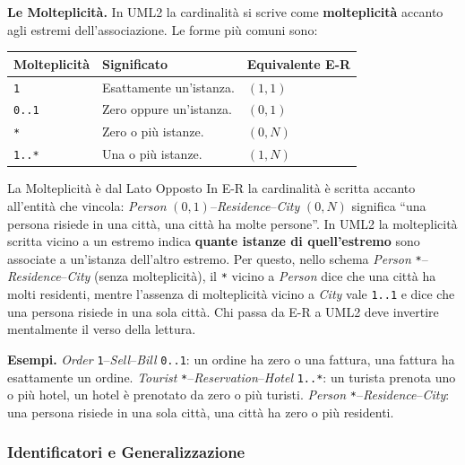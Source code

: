 \documentclass[12pt]{extarticle}
\begin{document}
\medskip
\noindent \textbf{Le Molteplicità.} In UML2 la cardinalità si scrive come \textbf{molteplicità} accanto agli estremi dell'associazione. Le forme più comuni sono:

\begin{center}
\small
\begin{tabular}{@{}L{2.4cm}L{6.4cm}L{6.6cm}@{}}
    \toprule
    \textbf{Molteplicità} & \textbf{Significato} & \textbf{Equivalente E-R} \\
    \midrule
    \texttt{1} & Esattamente un'istanza. & $(1,1)$ \\
    \addlinespace
    \texttt{0..1} & Zero oppure un'istanza. & $(0,1)$ \\
    \addlinespace
    \texttt{*} & Zero o più istanze. & $(0,N)$ \\
    \addlinespace
    \texttt{1..*} & Una o più istanze. & $(1,N)$ \\
    \bottomrule
\end{tabular}
\end{center}

\begin{cbox}{La Molteplicità è dal Lato Opposto}
\noindent In E-R la cardinalità è scritta accanto all'entità che vincola: \textit{Person} $(0,1)$--\textit{Residence}--\textit{City} $(0,N)$ significa ``una persona risiede in una città, una città ha molte persone''. In UML2 la molteplicità scritta vicino a un estremo indica \textbf{quante istanze di quell'estremo} sono associate a un'istanza dell'altro estremo. Per questo, nello schema \textit{Person} \texttt{*}--\textit{Residence}--\textit{City} (senza molteplicità), il \texttt{*} vicino a \textit{Person} dice che una città ha molti residenti, mentre l'assenza di molteplicità vicino a \textit{City} vale \texttt{1..1} e dice che una persona risiede in una sola città. Chi passa da E-R a UML2 deve invertire mentalmente il verso della lettura.
\end{cbox}

\medskip
\noindent \textbf{Esempi.} \textit{Order} \texttt{1}--\textit{Sell}--\textit{Bill} \texttt{0..1}: un ordine ha zero o una fattura, una fattura ha esattamente un ordine. \textit{Tourist} \texttt{*}--\textit{Reservation}--\textit{Hotel} \texttt{1..*}: un turista prenota uno o più hotel, un hotel è prenotato da zero o più turisti. \textit{Person} \texttt{*}--\textit{Residence}--\textit{City}: una persona risiede in una sola città, una città ha zero o più residenti.

\subsubsection{Identificatori e Generalizzazione}
\end{document}
